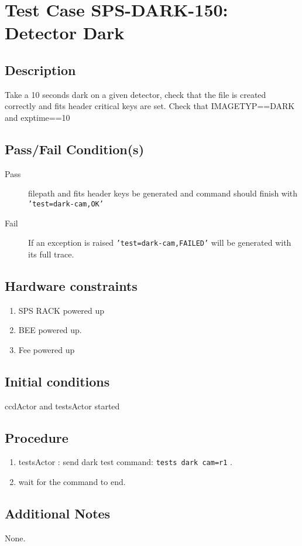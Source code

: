 \section{Test Case SPS-DARK-150: Detector Dark}

\subsection{Description}

Take a 10 seconds dark on a given detector, check that the file is created correctly and fits header critical keys are set.
Check that IMAGETYP==DARK and exptime==10


\subsection{Pass/Fail Condition(s)}

\begin{description}
\item [Pass] filepath and fits header keys be generated and command should finish with \texttt{'test=dark-cam,OK'}
\item [Fail] If an exception is raised \texttt{'test=dark-cam,FAILED'} will be generated with its full trace.

\end{description}

\subsection{Hardware constraints}

\begin{enumerate}
    \item SPS RACK powered up
    \item BEE powered up.
    \item Fee powered up
\end{enumerate}

\subsection{Initial conditions}

ccdActor and testsActor started

\subsection{Procedure}

\begin{enumerate}
    \item testsActor : send dark test command: \texttt{tests dark cam=r1} .
    \item wait for the command to end.
\end{enumerate}

\subsection{Additional Notes}
None.
